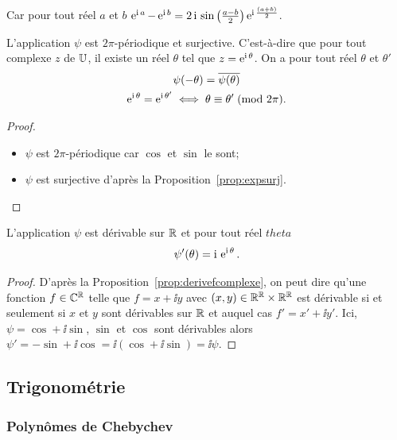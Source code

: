 Car pour tout réel \(a\) et \(b\) \(\operatorname{e}^{\operatorname{i} a}-\operatorname{e}^{\operatorname{i} b} = 2\operatorname{i}{}
\sin\left(\frac{a-b}{2}\right)\operatorname{e}^{\operatorname{i} \frac{(a + b)}{2}}\).

\begin{prop}
  L'application \(\psi\) est  \(2\pi\)-périodique et surjective. C'est-à-dire
  que pour tout complexe \(z\) de \(\mathbb{U}\), il existe un réel \(\theta\) tel que
  \(z = \operatorname{e}^{\operatorname{i} \theta}\). On a pour tout réel \(\theta\) et \(\theta'\)
  \begin{gather}
    \psi(-\theta) = \overline{\psi(\theta)}\\
    \operatorname{e}^{\operatorname{i} \theta} = \operatorname{e}^{\operatorname{i} \theta'} \iff \theta \equiv \theta'\!\pmod {2\pi}.
  \end{gather}
\end{prop}

\begin{proof}
  \begin{itemize}
    \item \(\psi\) est \(2\pi\)-périodique car \(\cos\) et \(\sin\) le sont;
    \item \(\psi\) est surjective d'après la Proposition~\ref{prop:expsurj}.
  \end{itemize}
\end{proof}

\begin{prop}
  L'application \(\psi\) est dérivable sur \(\mathbb{R}\) et pour tout réel \(theta\)
  \[\psi'(\theta) = \operatorname{i}{}\operatorname{e}^{\operatorname{i} \theta}.\]
\end{prop}

\begin{proof}
  D'après la Proposition~\ref{prop:derivefcomplexe}, on peut dire qu'une
  fonction \(f \in{}\mathbb{C}^{\mathbb{R}}\) telle que \(f = x + \ii{}y\) avec \((x, y) \in{}
  \mathbb{R}^{\mathbb{R}} \times \mathbb{R}^{\mathbb{R}}\) est dérivable si et seulement si \(x\) et \(y\)
  sont dérivables sur \(\mathbb{R}\) et auquel cas \(f' = x'  + \ii{}y'\). Ici, \(\psi
  = \cos  + \ii{}\sin\), \(\sin\) et \(\cos\) sont dérivables alors \(\psi' =
  -\sin + \ii{}\cos = \ii{}(\cos  + \ii{}\sin) = \ii{}\psi\).
\end{proof}

\subsection{Trigonométrie}\label{subsec:complexestrigo}
\subsubsection{Polynômes de Chebychev}\label{subsubsec:Chebychev}

